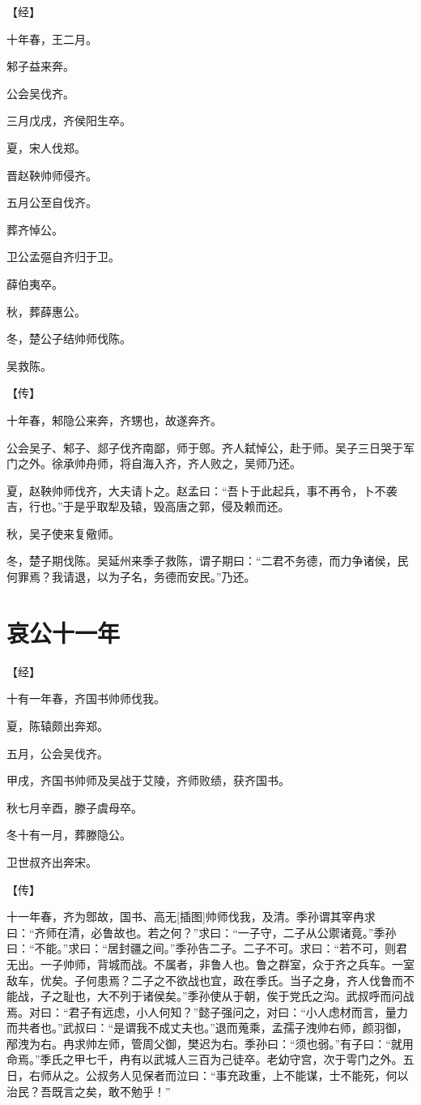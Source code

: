 \documentclass[a4paper,12pt,UTF8,twoside]{ctexbook}
\begin{document}
【经】

十年春，王二月。

邾子益来奔。

公会吴伐齐。

三月戊戌，齐侯阳生卒。

夏，宋人伐郑。

晋赵鞅帅师侵齐。

五月公至自伐齐。

葬齐悼公。

卫公孟彄自齐归于卫。

薛伯夷卒。

秋，葬薛惠公。

冬，楚公子结帅师伐陈。

吴救陈。

【传】

十年春，邾隐公来奔，齐甥也，故遂奔齐。

公会吴子、邾子、郯子伐齐南鄙，师于鄎。齐人弑悼公，赴于师。吴子三日哭于军门之外。徐承帅舟师，将自海入齐，齐人败之，吴师乃还。

夏，赵鞅帅师伐齐，大夫请卜之。赵孟曰：“吾卜于此起兵，事不再令，卜不袭吉，行也。”于是乎取犁及辕，毁高唐之郭，侵及赖而还。

秋，吴子使来复儆师。

冬，楚子期伐陈。吴延州来季子救陈，谓子期曰：“二君不务德，而力争诸侯，民何罪焉？我请退，以为子名，务德而安民。”乃还。

\chapter{哀公十一年}




【经】

十有一年春，齐国书帅师伐我。

夏，陈辕颇出奔郑。

五月，公会吴伐齐。

甲戌，齐国书帅师及吴战于艾陵，齐师败绩，获齐国书。

秋七月辛酉，滕子虞母卒。

冬十有一月，葬滕隐公。

卫世叔齐出奔宋。

【传】

十一年春，齐为鄎故，国书、高无[插图]帅师伐我，及清。季孙谓其宰冉求曰：“齐师在清，必鲁故也。若之何？”求曰：“一子守，二子从公禦诸竟。”季孙曰：“不能。”求曰：“居封疆之间。”季孙告二子。二子不可。求曰：“若不可，则君无出。一子帅师，背城而战。不属者，非鲁人也。鲁之群室，众于齐之兵车。一室敌车，优矣。子何患焉？二子之不欲战也宜，政在季氏。当子之身，齐人伐鲁而不能战，子之耻也，大不列于诸侯矣。”季孙使从于朝，俟于党氏之沟。武叔呼而问战焉。对曰：“君子有远虑，小人何知？”懿子强问之，对曰：“小人虑材而言，量力而共者也。”武叔曰：“是谓我不成丈夫也。”退而蒐乘，孟孺子洩帅右师，颜羽御，邴洩为右。冉求帅左师，管周父御，樊迟为右。季孙曰：“须也弱。”有子曰：“就用命焉。”季氏之甲七千，冉有以武城人三百为己徒卒。老幼守宫，次于雩门之外。五日，右师从之。公叔务人见保者而泣曰：“事充政重，上不能谋，士不能死，何以治民？吾既言之矣，敢不勉乎！”
\end{document}
